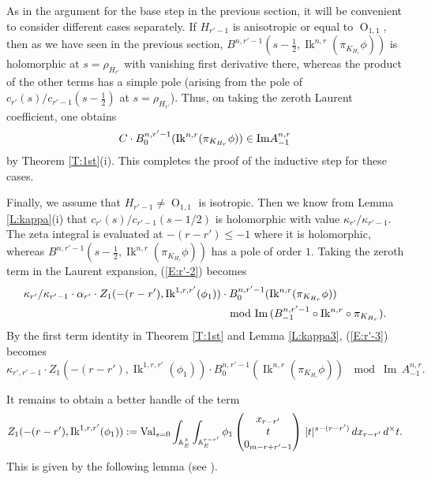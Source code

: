 \documentclass[10pt]{amsart}
\theoremstyle{plain}
\numberwithin{equation}{section}
\begin{document}
 As in the argument for the base step in the previous section, it will
 be convenient to consider different cases separately. If $H_{r'-1}$
 is anisotropic or equal to ${\operatorname{O}}_{1,1}$, then as we have seen in the
 previous section,  
 $B^{n, r'-1}(s-\frac{1}{2}, {\operatorname{Ik}}^{n,r}(\pi_{K_{H_r}}\phi))$ is
 holomorphic at $s = \rho_{H_{r'}}$ with vanishing first derivative
 there, whereas the product of the other terms has a simple pole
 (arising from the pole of $ c_{r'}(s) / c_{r'-1}(s - \frac{1}{2})$ at
 $s = \rho_{H_{r'}}$). Thus, on taking the zeroth Laurent coefficient,
 one obtains 
 \[  C \cdot B^{n, r'-1}_0({\operatorname{Ik}}^{n,r}(\pi_{K_{H_r}}\phi))   \in {\rm Im} A^{n,r}_{-1} \]
  by Theorem \ref{T:1st}(i).   This completes the proof of the inductive step for these cases.
  \vskip 5pt
  
  Finally, we assume that $H_{r'-1}\ne {\operatorname{O}}_{1,1}$ is isotropic.
   Then we know from Lemma
 \ref{L:kappa}(i) that $c_{r'}(s)/c_{r'-1}(s- 1/2)$ is holomorphic with
 value $\kappa_{r'}/\kappa_{r'-1}$. The zeta integral is evaluated at
 $-(r-r') \leq -1$ where it is holomorphic, whereas 
 $B^{n, r'-1}(s-\frac{1}{2}, {\operatorname{Ik}}^{n,r}(\pi_{K_{H_r}}\phi))$ has a pole
 of order $1$.  Taking the zeroth term in the Laurent expansion, 
 (\ref{E:r'-2}) becomes
\begin{align}\label{E:r'-3}
 &\kappa_{r'}/\kappa_{r'-1} \cdot \alpha_{r'} \cdot
 Z_1(-(r-r'), {\operatorname{Ik}}^{1,r,r'}(\phi_1)) \cdot  B^{n,
   r'-1}_0({\operatorname{Ik}}^{n,r}(\pi_{K_{H_r}}\phi))  \\
 &\hskip 2.5in \mod {{\operatorname{Im\,}}(B^{n,r'-1}_{-1} \circ {\operatorname{Ik}}^{n,r} \circ
   \pi_{K_{H_r}})}.\notag
\end{align}
 By the first term identity in Theorem \ref{T:1st} and Lemma
 \ref{L:kappa3}, (\ref{E:r'-3}) becomes
  \begin{equation} \label{E:comple}
    \kappa_{r',r'-1} \cdot Z_1(-(r-r'), {\operatorname{Ik}}^{1,r,r'}(\phi_1)) \cdot
    B^{n, r'-1}_0({\operatorname{Ik}}^{n,r}(\pi_{K_{H_r}}\phi))  \, \mod {{\operatorname{Im\,}}
    A^{n,r}_{-1}}. 
\end{equation}
 
 \vskip 5pt
 It remains to obtain a better handle of  the term
 \[   Z_1(-(r-r'), {\operatorname{Ik}}^{1,r,r'}(\phi_1)):= {\rm Val}_{s=0} 
\int_{{\mathbb{A}}_E^{\times}}  \int_{{\mathbb{A}}_E^{r-r'}}  \phi_1 \left(   \begin{matrix}
x_{r-r'}  \\
 t \\
 0_{m-r+r'-1} \end{matrix} \right) \, |t|^{s - (r-r')} \, dx_{r-r'}  \,  d^{\times} t. \] 
 This is given by the following lemma (see \cite[Pg. 231, (7.1)]{I1}).
 \vskip 5pt
 
\end{document}
